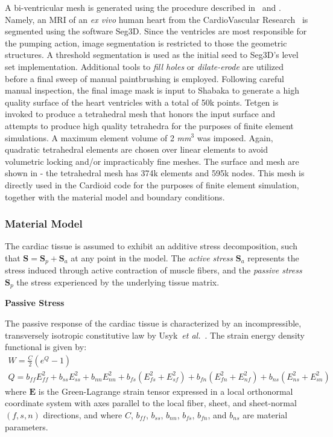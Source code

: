 A bi-ventricular mesh is generated using the procedure described in~ and . Namely, an MRI of an \textit{ex vivo} human heart from the CardioVascular Research~\cite{cvgg} is segmented using the software Seg3D. Since the ventricles are most responsible for the pumping action, image segmentation is restricted to those the geometric structures. A threshold segmentation is used as the initial seed to Seg3D's level set implementation. Additional tools to \textit{fill holes} or \textit{dilate-erode} are utilized before a final sweep of manual paintbrushing is employed. Following careful manual inspection, the final image mask is input to Shabaka to generate a high quality surface of the heart ventricles with a total of 50k points. Tetgen is invoked to produce a tetrahedral mesh that honors the input surface and attempts to produce high quality tetrahedra for the purposes of finite element simulations. A maximum element volume of 2 \textit{mm$^3$} was imposed. Again, quadratic tetrahedral elements are chosen over linear elements to avoid volumetric locking and/or impracticably fine meshes. The surface and mesh are shown in  - the tetrahedral mesh has 374k elements and 595k nodes. This mesh is directly used in the Cardioid code for the purposes of finite element simulation, together with the material model and boundary conditions.

\subsubsection{Material Model}
\label{Material Model}

The cardiac tissue is assumed to exhibit an additive stress decomposition, such that $\bm{S} = \bm{S}_p + \bm{S}_a$ at any point in the model. The \textit{active stress} $\bm{S}_a$ represents the stress induced through active contraction of muscle fibers, and the \textit{passive stress} $\bm{S}_p$ the stress experienced by the underlying tissue matrix.

\textbf{Passive Stress}

The passive response of the cardiac tissue is characterized by an incompressible, transversely isotropic constitutive law by Usyk~\textit{et al.}~\cite{usyk_2002}. The strain energy density functional is given by:
\begin{gather}
W = \frac{C}{2}\left(e^Q -1\right) \\
Q = b_{ff} E^2_{ff} + b_{ss} E^2_{ss} + b_{nn} E^2_{nn} + b_{fs}\left(E^2_{fs} + E^2_{sf}\right) + b_{fn}\left(E^2_{fn} + E^2_{nf}\right) + b_{ns}\left(E^2_{ns} + E^2_{sn}\right)
\end{gather}
where $\bm{E}$ is the Green-Lagrange strain tensor expressed in a local orthonormal coordinate system with axes parallel to the local fiber, sheet, and sheet-normal $(f,s,n)$ directions, and where $C$, $b_{ff}$, $b_{ss}$, $b_{nn}$, $b_{fs}$, $b_{fn}$, and $b_{ns}$ are material parameters.

